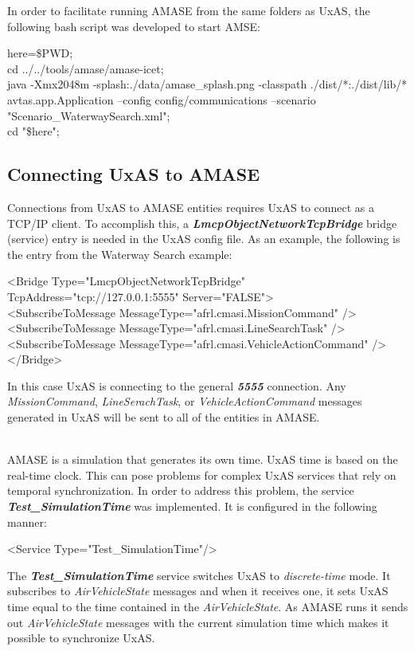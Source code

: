 In order to facilitate running AMASE from the same folders as UxAS, the following bash script was developed to start AMSE:
\begin{fullwidth}
\begin{docspec}
here=\$PWD;\\
cd ../../tools/amase/amase-icet;\\
java -Xmx2048m -splash:./data/amase\_splash.png -classpath ./dist/*:./dist/lib/*  avtas.app.Application --config config/communications --scenario "Scenario\_WaterwaySearch.xml";\\
cd "\$here";
\end{docspec}
\end{fullwidth}


\subsection{Connecting UxAS to AMASE}
Connections from UxAS to AMASE entities requires UxAS to connect as a TCP/IP client. To accomplish this, a \textbf{\textit{LmcpObjectNetworkTcpBridge}} bridge (service) entry is needed in the UxAS config file. As an example, the following is the entry from the Waterway Search example:

\begin{fullwidth}
\begin{docspec}
    <Bridge Type="LmcpObjectNetworkTcpBridge" TcpAddress="tcp://127.0.0.1:5555" Server="FALSE">\\
        \quad <SubscribeToMessage MessageType="afrl.cmasi.MissionCommand" />\\
        \quad <SubscribeToMessage MessageType="afrl.cmasi.LineSearchTask" />\\
        \quad <SubscribeToMessage MessageType="afrl.cmasi.VehicleActionCommand" />\\
    </Bridge>
\end{docspec}
\end{fullwidth}
In this case UxAS is connecting to the general \textbf{\textit{5555}} connection. Any \textit{MissionCommand}, \textit{LineSerachTask}, or \textit{VehicleActionCommand} messages generated in UxAS will be sent to all of the entities in AMASE.

\\
AMASE is a simulation that generates its own time. UxAS time is based on the real-time clock. This can pose problems for complex UxAS services that rely on temporal synchronization. In order to address this problem, the service \textbf{\textit{Test\_SimulationTime}} was implemented. It is configured in the following manner:
\begin{docspec}
<Service Type="Test\_SimulationTime"/>
\end{docspec}
The \textbf{\textit{Test\_SimulationTime}} service switches UxAS to \textit{discrete-time} mode. It subscribes to \textit{AirVehicleState} messages and when it receives one, it sets UxAS time equal to the time contained in the \textit{AirVehicleState}. As AMASE runs it sends out \textit{AirVehicleState} messages with the current simulation time which makes it possible to synchronize UxAS. 

